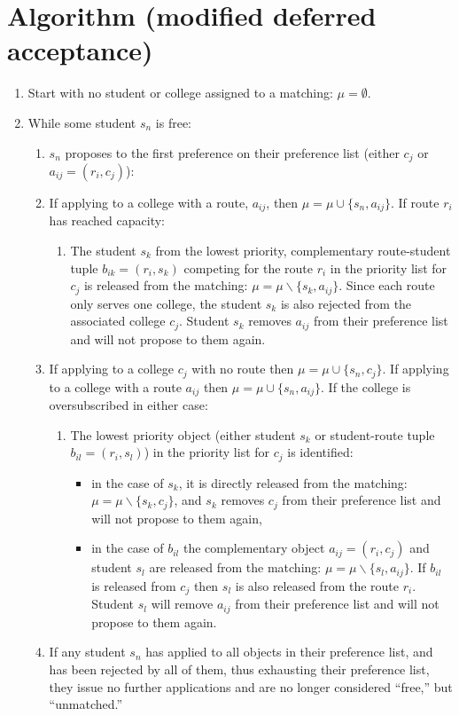\documentclass{article}
\begin{document}
\section{Algorithm (modified deferred acceptance)}
\begin{enumerate}
\item Start with no student or college assigned to a matching: $\mu = \emptyset$.
\item While some student $s_n$ is free:
    \begin{enumerate}
        \item $s_n$ proposes to the first preference on their preference list (either $c_j$ or $a_{ij} = (r_i,c_j)$):
        \item If applying to a college with a route, $a_{ij}$, then $\mu = \mu \cup \{s_n, a_{ij}\}$. If route $r_i$ has reached capacity:
        \begin{enumerate}
            \item The student $s_k$ from the lowest priority, complementary route-student tuple $b_{ik} = (r_i,s_k)$ competing for the route $r_i$ in the priority list for $c_j$ is released from the matching: $\mu = \mu \backslash \{s_k, a_{ij}\}$. Since each route only serves one college, the student $s_k$ is also rejected from the associated college $c_j$. Student $s_k$ removes $a_{ij}$ from their preference list and will not propose to them again.
        \end{enumerate}
        \item If applying to a college $c_j$ with no route then $\mu = \mu \cup \{s_n, c_j\}$. If applying to a college with a route $a_{ij}$ then $\mu = \mu \cup \{s_n, a_{ij}\}$. If the college is oversubscribed in either case:
        \begin{enumerate}
            \item The lowest priority object (either student $s_k$ or student-route tuple $b_{il} = (r_i,s_l)$) in the priority list for $c_j$ is identified:
            \begin{itemize}
                \item in the case of $s_k$, it is directly released from the matching: $\mu = \mu \backslash \{s_k, c_j\}$, and $s_k$ removes $c_j$ from their preference list and will not propose to them again,
                \item in the case of $b_{il}$ the complementary object $a_{ij} = (r_i,c_j)$ and student $s_l$ are released from the matching: $\mu = \mu \backslash \{s_l, a_{ij}\}$. If $b_{il}$ is released from $c_j$ then $s_l$ is also released from the route $r_i$. Student $s_l$ will remove $a_{ij}$ from their preference list and will not propose to them again.
            \end{itemize}
        \end{enumerate}
        \item If any student $s_n$ has applied to all objects in their preference list, and has been rejected by all of them, thus exhausting their preference list, they issue no further applications and are no longer considered \enquote{free,} but \enquote{unmatched.}
    \end{enumerate}
\end{enumerate}
\end{document}
